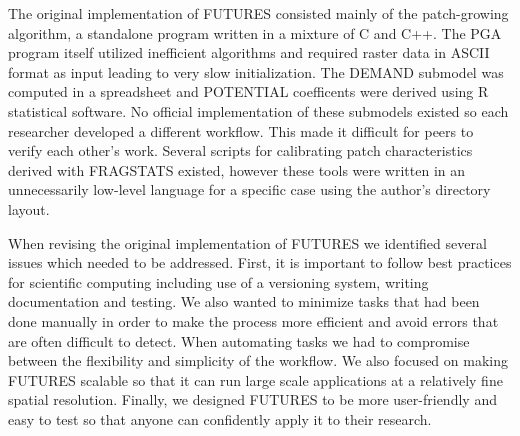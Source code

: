 \documentclass{isprs}
\begin{document}
The original implementation of FUTURES consisted mainly of the patch-growing 
algorithm, a standalone program written in a mixture of C and C++.
The PGA program itself utilized inefficient algorithms and required raster data in ASCII
format as input leading to very slow initialization. %
The DEMAND submodel was computed in a spreadsheet and POTENTIAL coefficents
were derived using R statistical software. No official
implementation of these submodels existed so each researcher
developed a different workflow. This made it difficult for peers to verify each other's work. 
%
Several scripts for calibrating patch 
characteristics derived with FRAGSTATS \cite{fragstats} existed, however these tools
were written 
in an unnecessarily low-level language
for a specific case 
using the author's directory layout.

When revising the original implementation of FUTURES we identified
several issues which needed to be addressed. %
First, it is important to follow best practices for scientific computing \cite{wilson2014best}
including use of a versioning system, writing documentation and testing.
We also wanted to minimize tasks that had been done manually in order to make the process more efficient and avoid errors 
that are often difficult to detect.
When automating tasks 
we had to compromise between 
the flexibility and simplicity %
of the workflow.
%
We also focused on making FUTURES scalable 
so that it can run
large scale applications
at a relatively fine spatial resolution.
Finally, we designed FUTURES to be more user-friendly and easy to test so that
anyone can confidently apply it to their research.
\end{document}

